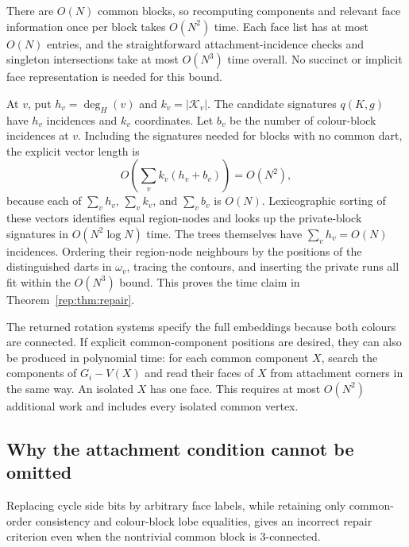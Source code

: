 There are $O(N)$ common blocks, so recomputing components and relevant
face information once per block takes $O(N^2)$ time.  Each face list has
at most $O(N)$ entries, and the straightforward attachment-incidence
checks and singleton intersections take at most $O(N^3)$ time overall.
No succinct or implicit face representation is needed for this bound.

At $v$, put $h_v=\deg_H(v)$ and $k_v=|\mathcal K_v|$.  The candidate
signatures $q(K,g)$ have $h_v$ incidences and $k_v$ coordinates.  Let $b_v$
be the number of colour-block incidences at $v$.  Including the signatures
needed for blocks with no common dart, the explicit vector length is
\[
 O\!\left(\sum_v k_v(h_v+b_v)\right)=O(N^2),
\]
because each of $\sum_v h_v$, $\sum_v k_v$, and $\sum_v b_v$ is $O(N)$.
Lexicographic sorting of these vectors identifies equal region-nodes and
looks up the private-block signatures in $O(N^2\log N)$ time.  The trees
themselves have $\sum_v h_v=O(N)$ incidences.  Ordering their region-node
neighbours by the positions of the distinguished darts in $\omega_v$,
tracing the contours, and inserting the private runs all fit within the
$O(N^3)$ bound.  This proves the time claim in
Theorem~\ref{rep:thm:repair}.

The returned rotation systems specify the full embeddings because both
colours are connected.  If explicit common-component positions are
desired, they can also be produced in polynomial time: for each common
component $X$, search the components of $G_i-V(X)$ and read their faces
of $X$ from attachment corners in the same way.  An isolated $X$ has one
face.  This requires at most $O(N^2)$ additional work and includes every
isolated common vertex.

\subsection{Why the attachment condition cannot be omitted}
\label{rep:counterexample}

\begin{proposition}
\label{rep:prop:incidence-counterexample}
Replacing cycle side bits by arbitrary face labels, while retaining only
common-order consistency and colour-block lobe equalities, gives an
incorrect repair criterion even when the nontrivial common block is
3-connected.
\end{proposition}

